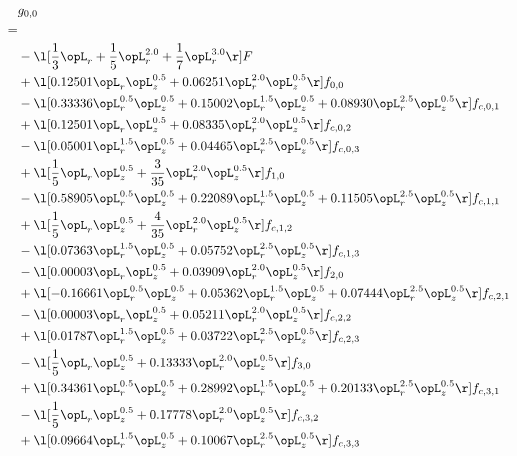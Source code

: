 \begin{alignat}{2} 
\label{eq:g_00_0} 
& g_{0,0} \nonumber \\ 
 = \\ 
& - \l[ \frac{1}{3} \opL_r + \frac{1}{5} \opL_r^{2.0} + \frac{1}{7} \opL_r^{3.0}  \r] F \nonumber \\ 
& + \l[  0.12501 \opL_r \opL_z^{0.5} +  0.06251 \opL_r^{2.0} \opL_z^{0.5}  \r] f_{0,0} \nonumber \\ 
& - \l[  0.33336 \opL_r^{0.5} \opL_z^{0.5} +  0.15002 \opL_r^{1.5} \opL_z^{0.5} +  0.08930 \opL_r^{2.5} \opL_z^{0.5}  \r] f_{c,0,1} \nonumber \\ 
& + \l[  0.12501 \opL_r \opL_z^{0.5} +  0.08335 \opL_r^{2.0} \opL_z^{0.5}  \r] f_{c,0,2} \nonumber \\ 
& - \l[  0.05001 \opL_r^{1.5} \opL_z^{0.5} +  0.04465 \opL_r^{2.5} \opL_z^{0.5}  \r] f_{c,0,3} \nonumber \\ 
& + \l[ \frac{1}{5} \opL_r \opL_z^{0.5} + \frac{3}{35} \opL_r^{2.0} \opL_z^{0.5}  \r] f_{1,0} \nonumber \\ 
& - \l[  0.58905 \opL_r^{0.5} \opL_z^{0.5} +  0.22089 \opL_r^{1.5} \opL_z^{0.5} +  0.11505 \opL_r^{2.5} \opL_z^{0.5}  \r] f_{c,1,1} \nonumber \\ 
& + \l[ \frac{1}{5} \opL_r \opL_z^{0.5} + \frac{4}{35} \opL_r^{2.0} \opL_z^{0.5}  \r] f_{c,1,2} \nonumber \\ 
& - \l[  0.07363 \opL_r^{1.5} \opL_z^{0.5} +  0.05752 \opL_r^{2.5} \opL_z^{0.5}  \r] f_{c,1,3} \nonumber \\ 
& - \l[  0.00003 \opL_r \opL_z^{0.5} +  0.03909 \opL_r^{2.0} \opL_z^{0.5}  \r] f_{2,0} \nonumber \\ 
& + \l[  -0.16661 \opL_r^{0.5} \opL_z^{0.5} +  0.05362 \opL_r^{1.5} \opL_z^{0.5} +  0.07444 \opL_r^{2.5} \opL_z^{0.5}  \r] f_{c,2,1} \nonumber \\ 
& - \l[  0.00003 \opL_r \opL_z^{0.5} +  0.05211 \opL_r^{2.0} \opL_z^{0.5}  \r] f_{c,2,2} \nonumber \\ 
& + \l[  0.01787 \opL_r^{1.5} \opL_z^{0.5} +  0.03722 \opL_r^{2.5} \opL_z^{0.5}  \r] f_{c,2,3} \nonumber \\ 
& - \l[ \frac{1}{5} \opL_r \opL_z^{0.5} +  0.13333 \opL_r^{2.0} \opL_z^{0.5}  \r] f_{3,0} \nonumber \\ 
& + \l[  0.34361 \opL_r^{0.5} \opL_z^{0.5} +  0.28992 \opL_r^{1.5} \opL_z^{0.5} +  0.20133 \opL_r^{2.5} \opL_z^{0.5}  \r] f_{c,3,1} \nonumber \\ 
& - \l[ \frac{1}{5} \opL_r \opL_z^{0.5} +  0.17778 \opL_r^{2.0} \opL_z^{0.5}  \r] f_{c,3,2} \nonumber \\ 
& + \l[  0.09664 \opL_r^{1.5} \opL_z^{0.5} +  0.10067 \opL_r^{2.5} \opL_z^{0.5}  \r] f_{c,3,3} \nonumber \\ 
\end{alignat} 


